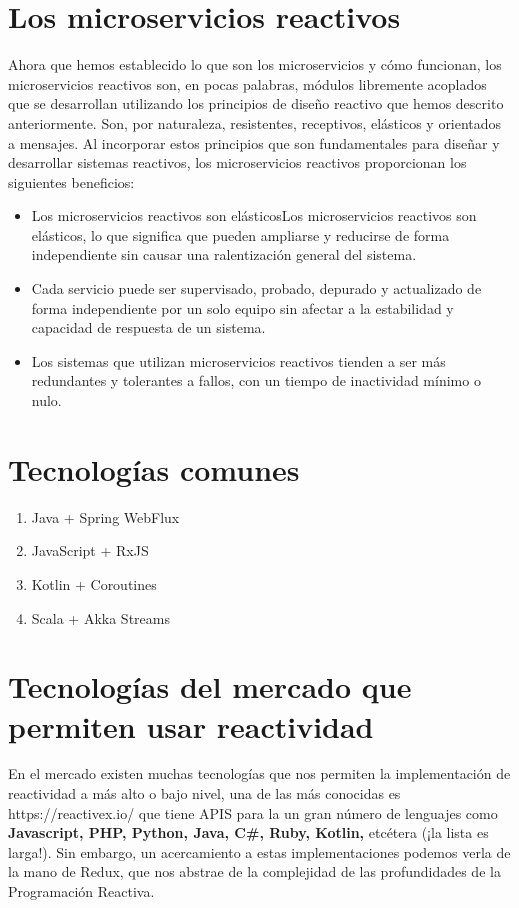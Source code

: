 \documentclass[12pt]{article}
\begin{document}
\section*{Los microservicios reactivos}
Ahora que hemos establecido lo que son los microservicios y cómo funcionan, los microservicios reactivos son, en pocas palabras, módulos libremente acoplados que se desarrollan utilizando los principios de diseño reactivo que hemos descrito anteriormente. Son, por naturaleza, resistentes, receptivos, elásticos y orientados a mensajes. Al incorporar estos principios que son fundamentales para diseñar y desarrollar sistemas reactivos, los microservicios reactivos proporcionan los siguientes beneficios:

\begin{itemize}
    \item Los microservicios reactivos son elásticosLos microservicios reactivos son elásticos, lo que significa que pueden ampliarse y reducirse de forma independiente sin causar una ralentización general del sistema.
\end{itemize}
\begin{itemize}
    \item Cada servicio puede ser supervisado, probado, depurado y actualizado de forma independiente por un solo equipo sin afectar a la estabilidad y capacidad de respuesta de un sistema.
\end{itemize}
\begin{itemize}
    \item Los sistemas que utilizan microservicios reactivos tienden a ser más redundantes y tolerantes a fallos, con un tiempo de inactividad mínimo o nulo.
\end{itemize}

\section*{Tecnologías comunes}

\begin{enumerate}
    \item Java + Spring WebFlux
    \item JavaScript + RxJS
    \item Kotlin + Coroutines
    \item Scala + Akka Streams
\end{enumerate}

\section*{Tecnologías del mercado que permiten usar reactividad}
En el mercado existen muchas tecnologías que nos permiten la implementación de reactividad a más alto o bajo nivel, una de las más conocidas es https://reactivex.io/ que tiene APIS para la un gran número de lenguajes como \textbf{Javascript, PHP, Python, Java, C#, Ruby, Kotlin,} etcétera (¡la lista es larga!). Sin embargo, un acercamiento a estas implementaciones podemos verla de la mano de Redux, que nos abstrae de la complejidad de las profundidades de la Programación Reactiva.  
\end{document}
